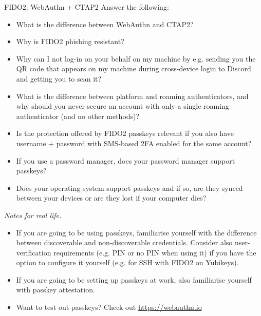 \documentclass{homework}
\begin{document}
\begin{task}{FIDO2: WebAuthn + CTAP2}
  Answer the following:
  \begin{itemize}
    \item What is the difference between WebAuthn and CTAP2?
    \item Why is FIDO2 phishing resistant?
    \item Why can I not log-in on your behalf on my machine by e.g. sending you the QR code that appears on my machine during cross-device login to Discord and getting you to scan it?
    \item What is the difference between platform and roaming authenticators, and why should you never secure an account with only a single roaming authenticator (and no other methods)?
    \item Is the protection offered by FIDO2 passkeys relevant if you also have username + password with SMS-based 2FA enabled for the same account?
    \item If you use a password manager, does your password manager support passkeys?
    \item Does your operating system support passkeys and if so, are they synced between your devices or are they lost if your computer dies?
  \end{itemize}

  \textit{Notes for real life.}
  \begin{itemize}
    \item If you are going to be using passkeys, familiarise yourself with the difference between discoverable and non-discoverable credentials.
    Consider also user-verification requirements (e.g. PIN or no PIN when using it) if you have the option to configure it yourself (e.g. for SSH with FIDO2 on Yubikeys).

    \item If you are going to be setting up passkeys at work, also familiarise yourself with passkey attestation.

    \item Want to test out passkeys?
    Check out {\small\url{https://webauthn.io}}
  \end{itemize}
\end{task}
\end{document}
